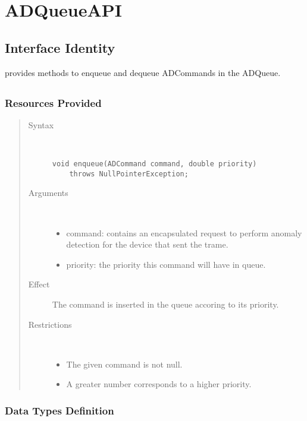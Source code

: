 \section{ADQueueAPI}
\label{api:ad-queue-api}

\subsection{Interface Identity}

\npar {} provides methods to enqueue and dequeue
ADCommands in the ADQueue.

\subsection{}

\subsubsection{Resources Provided}

\begin{quote}
	\begin{description}
		\item[Syntax] \ 
		\begin{verbatim}
void enqueue(ADCommand command, double priority) 
    throws NullPointerException;
		\end{verbatim}
		\item[Arguments] \
		\begin{itemize}
			\item command: contains an encapsulated request to perform anomaly detection
			for the device that sent the trame.
			\item priority: the priority this command will have in queue. 
		\end{itemize}
		\item[Effect] The command is inserted in the queue accoring to its priority.
		\item[Restrictions] \ 
		\begin{itemize}
			\item The given command is not null.
			\item A greater number corresponds to a higher priority. 
		\end{itemize}
	\end{description} 
\end{quote}

\subsubsection{Data Types Definition}

